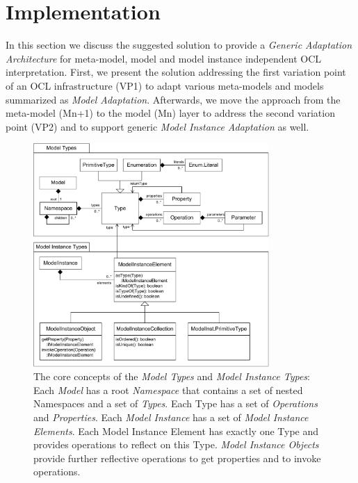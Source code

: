 \section{Implementation}

	In this section we discuss the suggested solution to provide a \emph{Generic Adaptation Architecture} for 
	meta-model, model and model instance independent OCL interpretation. First, we present the solution addressing
	the first variation point of an OCL infrastructure (VP1) to
	adapt	various meta-models and models summarized as \emph{Model Adaptation}. Afterwards, we move the approach
	from the meta-model (Mn+1) to the model (Mn) layer to address the second variation point (VP2) and to support 
	generic \emph{Model Instance Adaptation} as well.
	
	\begin{figure}[!t]
			\centering
				\includegraphics[width=0.80\textwidth]{figures/coreconcepts.pdf}
			\caption{The core concepts of the \emph{Model Types} and \emph{Model Instance Types}:
			Each \emph{Model} has a root \emph{Namespace} that contains a set of nested Namespaces and 
			a set of \emph{Types}. Each Type has a set of \emph{Operations} 
			and \emph{Properties}. 
			Each \emph{Model Instance} has a set of \emph{Model Instance Elements}. Each Model Instance
			Element has exactly one Type and provides 
			operations to reflect on this Type. \emph{Model Instance Objects} provide further reflective 
			operations to get properties and to invoke operations.}
			\label{fig:coreconcepts}
		\end{figure}

